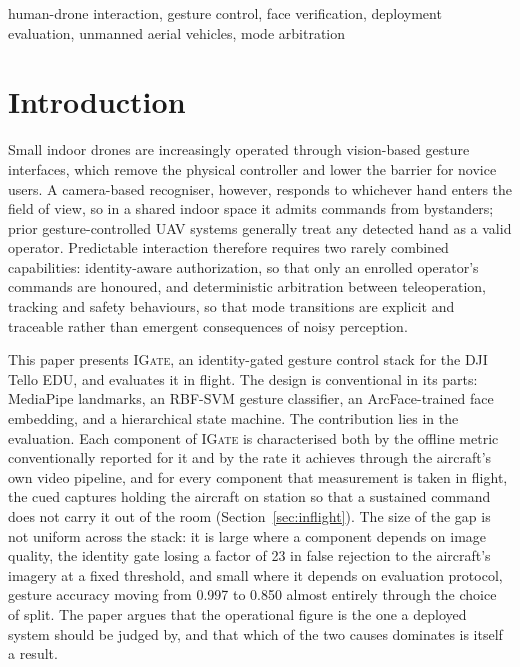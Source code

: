 \documentclass[conference]{IEEEtran}
\newcommand{\method}[1]{\textsc{#1}}
\begin{document}
\begin{IEEEkeywords}
human-drone interaction, gesture control, face verification, deployment
evaluation, unmanned aerial vehicles, mode arbitration
\end{IEEEkeywords}

\section{Introduction}

Small indoor drones are increasingly operated through vision-based gesture
interfaces, which remove the physical controller and lower the barrier for novice
users. A camera-based recogniser, however, responds to whichever hand enters the
field of view, so in a shared indoor space it admits commands from bystanders;
prior gesture-controlled UAV systems generally treat any detected hand as a valid
operator. Predictable interaction therefore requires two rarely combined
capabilities: identity-aware authorization, so that only an enrolled operator's
commands are honoured, and deterministic arbitration between teleoperation,
tracking and safety behaviours, so that mode transitions are explicit and
traceable rather than emergent consequences of noisy perception.

This paper presents \method{IGate}, an identity-gated gesture control stack for
the DJI Tello EDU, and evaluates it in flight. The design is conventional in its
parts: MediaPipe landmarks, an RBF-SVM gesture classifier, an ArcFace-trained
face embedding, and a hierarchical state machine. The contribution lies in the
evaluation. Each component of \method{IGate} is characterised both by the offline
metric conventionally reported for it and by the rate it achieves through the
aircraft's own video pipeline, and for every component that measurement is
taken in flight, the cued captures holding the aircraft on station so that a
sustained command does not carry it out of the room
(Section~\ref{sec:inflight}). The size of the gap is not uniform across the
stack: it is large where a component depends on image quality, the identity gate
losing a factor of 23 in false rejection to the aircraft's imagery at a fixed
threshold, and small where it depends on evaluation protocol, gesture accuracy
moving from 0.997 to 0.850 almost entirely through the choice of split. The
paper argues that the operational figure is the one a deployed system should be
judged by, and that which of the two causes dominates is itself a result.
\end{document}

